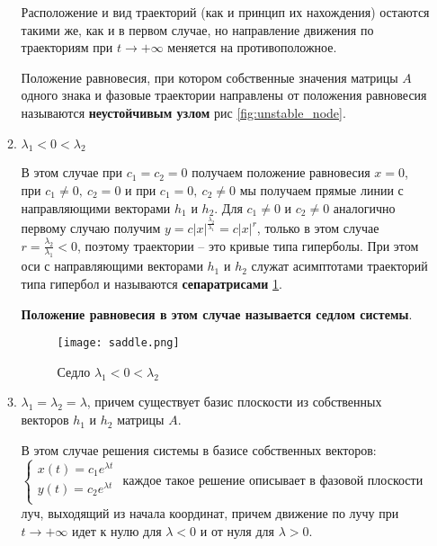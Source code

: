\begin{enumerate}
\begin{enumerate}
    Расположение и вид траекторий (как и принцип их нахождения) остаются такими же, как и в первом случае, но направление движения по траекториям при $t \rightarrow +\infty$ меняется на противоположное.
    
    \begin{definition}
    	Положение равновесия, при котором собственные значения матрицы $A$ одного знака и фазовые траектории направлены от положения равновесия называются \textbf{неустойчивым узлом} рис \ref{fig:unstable_node}.
    \end{definition}
    
    \item $\lambda_1 < 0 < \lambda_2$
    
    В этом случае при $c_1 = c_2 = 0$ получаем положение равновесия $x = 0$, при $c_1 \neq 0, ~ c_2 = 0$ и при $c_1 = 0, ~ c_2 \neq 0$ мы получаем прямые линии с направляющими векторами $h_1$ и $h_2$. Для $c_1 \neq 0$ и $c_2 \neq 0$ аналогично первому случаю получим $\displaystyle y = c |x|^{\frac{\lambda_2}{\lambda_1}} = c |x|^r$, только в этом случае $\displaystyle r = \frac{\lambda_2}{\lambda_1} < 0$, поэтому траектории -- это кривые типа гиперболы. При этом оси с направляющими векторами $h_1$ и $h_2$ служат асимптотами траекторий типа гипербол и называются \textbf{сепаратрисами} \ref{fig:saddle}.
    
    \textbf{Положение равновесия в этом случае называется седлом системы}.
    
    \begin{figure}[h!]
    	\centering
    	\texttt{[image: saddle.png]}
    	\caption{Седло $\lambda_1 < 0 < \lambda_2$}
    	\label{fig:saddle}
    \end{figure}

    \item $\lambda_1 = \lambda_2 = \lambda$, причем существует базис плоскости из собственных векторов $h_1$ и $h_2$ матрицы $A$.
    
    В этом случае решения системы в базисе собственных векторов:
    $\begin{cases}
    	x(t) = c_1 e^{\lambda t} \\
    	y(t) = c_2 e^{\lambda t} \\
    \end{cases}$
    каждое такое решение описывает в фазовой плоскости луч, выходящий из начала координат, причем движение по лучу при $t \rightarrow + \infty$ идет к нулю для $\lambda < 0$ и от нуля для $\lambda > 0$.
    

\end{enumerate}
\end{enumerate}

